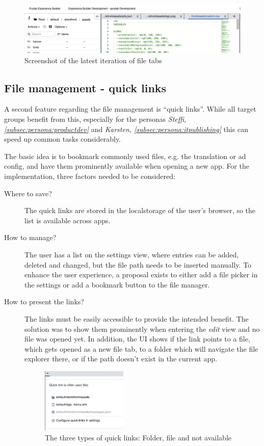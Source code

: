 \begin{figure}[h!]
  \includegraphics[width=\textwidth]{pics/file_tabs.png}
  \caption{Screenshot of the latest iteration of file tabs}
  \label{fig:file-tabs}
\end{figure}

\subsection{File management - quick links}

A second feature regarding the file management is ``quick links''. While all target groups benefit from this, especially for the personas \textit{Steffi, \ref{subsec:persona:productdev}} and \textit{Karsten, \ref{subsec:persona:itpublishing}}
this can speed up common tasks considerably.

The basic idea is to bookmark commonly used files, e.g. the translation or ad config, and have them prominently available when opening a new app.
For the implementation, three factors needed to be considered:
\begin{description}
  \item[Where to save?] The quick links are stored in the \Gls{localstorage} of the user's browser, so the list is available across apps.
  \item[How to manage?] The user has a list on the settings view, where entries can be added, deleted and changed, but the file path needs to be inserted manually. To enhance the user experience, a proposal exists to either add a file picker in the settings or add a bookmark button to the file manager.
  \item[How to present the links?] The links must be easily accessible to provide the intended benefit. The solution was to show them prominently when entering the \textit{edit} view and no file was opened yet.
  In addition, the UI shows if the link points to a file, which gets opened as a new file tab, to a folder which will navigate the file explorer there, or if the path doesn't exist in the current app.
  \begin{figure}[h!]
    \centering
    \includegraphics[width=0.4\textwidth]{pics/quick_links.png}
    \caption{The three types of quick links: Folder, file and not available}
  \end{figure}
\end{description}

